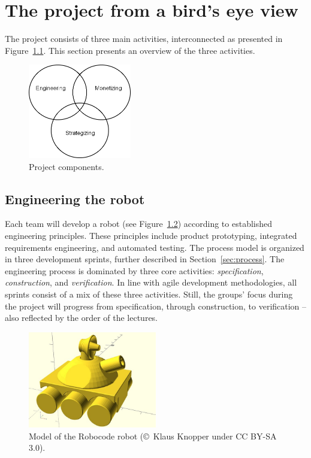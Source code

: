 \documentclass{scrreprt}
\begin{document}
\chapter{The project from a bird's eye view}
The project consists of three main activities, interconnected as presented in Figure~\ref{fig:components}. This section presents an overview of the three activities.

\begin{figure}
\centering
\includegraphics[width=0.40\textwidth]{figures/projectComponents.png}
\caption{Project components.}
\label{fig:components}
\end{figure}

\section{Engineering the robot}
Each team will develop a robot (see Figure~\ref{fig:robot}) according to established engineering principles. These principles include product prototyping, integrated requirements engineering, and automated testing. The process model is organized in three development sprints, further described in Section~\ref{sec:process}. The engineering process is dominated by three core activities: \textit{specification}, \textit{construction}, and \textit{verification}. In line with agile development methodologies, all sprints consist of a mix of these three activities. Still, the groups' focus during the project will progress from specification, through construction, to verification -- also reflected by the order of the lectures.

\begin{figure}
\centering
\includegraphics[width=0.50\textwidth]{figures/robotSide.jpg}
\caption{Model of the Robocode robot (\copyright~Klaus Knopper under CC BY-SA 3.0).}
\label{fig:robot}
\end{figure}
\end{document}
